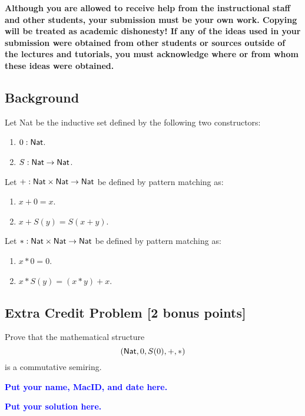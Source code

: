 \documentclass[11pt,fleqn]{article}
\newcommand{\mname}[1]{\mbox{\sf #1}}
\newcommand{\tarrow}{\rightarrow}
\begin{document}
\textbf{Although you are allowed to receive help from the
  instructional staff and other students, your submission must be your
  own work.  Copying will be treated as academic dishonesty! If any of
  the ideas used in your submission were obtained from other students
  or sources outside of the lectures and tutorials, you must
  acknowledge where or from whom these ideas were obtained.}

\newpage

\subsection*{Background}

Let \mname{Nat} be the inductive set defined by the following two
constructors:

\begin{enumerate}

  \item $0 : \mname{Nat}$.

  \item $S : \mname{Nat} \tarrow \mname{Nat}$.

\end{enumerate}

\noindent
Let $+ : \mname{Nat} \times \mname{Nat} \tarrow \mname{Nat}$ be
defined by pattern matching as:

\begin{enumerate}

  \item $x + 0 = x$.

  \item $x + S(y) = S(x + y)$.

\end{enumerate}

\noindent
Let $* : \mname{Nat} \times \mname{Nat} \tarrow \mname{Nat}$ be
defined by pattern matching as:

\begin{enumerate}

  \item $x * 0 = 0$.

  \item $x * S(y) = (x * y) + x$.

\end{enumerate}

\subsection*{Extra Credit Problem \textbf{[2 bonus points]}}

Prove that the mathematical structure \[(\mname{Nat},0,S(0),+,*)\] is
a commutative semiring.

\bigskip

\noindent
\textcolor{blue}{\textbf{Put your name, MacID, and date here.}}

\bigskip

\noindent
\textcolor{blue}{\textbf{Put your solution here.}}
\end{document}
